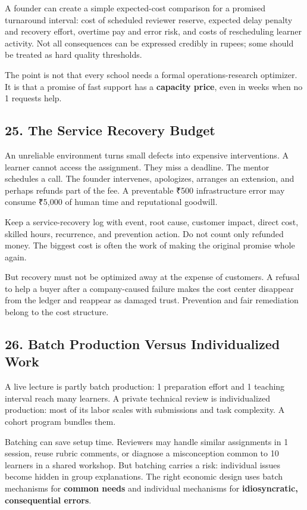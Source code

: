 A founder can create a simple expected-cost comparison for a promised turnaround interval: cost of scheduled reviewer reserve, expected delay penalty and recovery effort, overtime pay and error risk, and costs of rescheduling learner activity. Not all consequences can be expressed credibly in rupees; some should be treated as hard quality thresholds.

The point is not that every school needs a formal operations-research optimizer. It is that a promise of fast support has a \textbf{capacity price}, even in weeks when no 1 requests help.

\subsection*{25. The Service Recovery Budget}

An unreliable environment turns small defects into expensive interventions. A learner cannot access the assignment. They miss a deadline. The mentor schedules a call. The founder intervenes, apologizes, arranges an extension, and perhaps refunds part of the fee. A preventable ₹500 infrastructure error may consume ₹5,000 of human time and reputational goodwill.

Keep a service-recovery log with event, root cause, customer impact, direct cost, skilled hours, recurrence, and prevention action. Do not count only refunded money. The biggest cost is often the work of making the original promise whole again.

But recovery must not be optimized away at the expense of customers. A refusal to help a buyer after a company-caused failure makes the cost center disappear from the ledger and reappear as damaged trust. Prevention and fair remediation belong to the cost structure.

\subsection*{26. Batch Production Versus Individualized Work}

A live lecture is partly batch production: 1 preparation effort and 1 teaching interval reach many learners. A private technical review is individualized production: most of its labor scales with submissions and task complexity. A cohort program bundles them.

Batching can save setup time. Reviewers may handle similar assignments in 1 session, reuse rubric comments, or diagnose a misconception common to 10 learners in a shared workshop. But batching carries a risk: individual issues become hidden in group explanations. The right economic design uses batch mechanisms for \textbf{common needs} and individual mechanisms for \textbf{idiosyncratic, consequential errors}.

